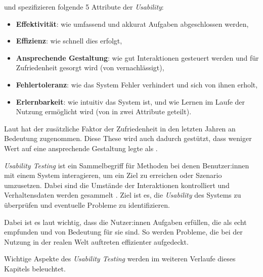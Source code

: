 \textcite{quesenberyDimensionsUsability2003} und \textcite{nielsenUsabilityEngineering1994} spezifizieren folgende 5 Attribute der \textit{Usability}:
\begin{itemize}
  \item \textbf{Effektivität}: wie umfassend und akkurat Aufgaben abgeschlossen werden,
  \item \textbf{Effizienz}: wie schnell dies erfolgt,
  \item \textbf{Ansprechende Gestaltung}: wie gut Interaktionen gesteuert werden und für Zufriedenheit gesorgt wird (von \citeauthor{nielsenUsabilityEngineering1994} vernachlässigt),
  \item \textbf{Fehlertoleranz}: wie das System Fehler verhindert und sich von ihnen erholt,
  \item \textbf{Erlernbarkeit}: wie intuitiv das System ist, und wie Lernen im Laufe der Nutzung ermöglicht wird (von \citeauthor{nielsenUsabilityEngineering1994} in zwei Attribute geteilt).
\end{itemize}
Laut \textcite{barnumUsabilityTesting2021} hat der zusätzliche Faktor der Zufriedenheit in den letzten Jahren an Bedeutung zugenommen. Diese These wird auch dadurch gestützt, dass \textcite{nielsenUsabilityEngineering1994} weniger Wert auf eine ansprechende Gestaltung legte als \textcite{quesenberyDimensionsUsability2003}.

\newpage

\textit{Usability Testing} ist ein Sammelbegriff für Methoden bei denen Benutzer:innen mit einem System interagieren, um ein Ziel zu erreichen oder Szenario umzusetzen. Dabei sind die Umstände der Interaktionen kontrolliert und Verhaltensdaten werden gesammelt \parencite{wichanskyUsabilityTesting2000}. Ziel ist es, die \textit{Usability} des Systems zu überprüfen und eventuelle Probleme zu identifizieren.

Dabei ist es laut \textcite{barnumUsabilityTesting2021} wichtig, dass die Nutzer:innen Aufgaben erfüllen, die als echt empfunden und von Bedeutung für sie sind. So werden Probleme, die bei der Nutzung in der realen Welt auftreten effizienter aufgedeckt.

Wichtige Aspekte des \textit{Usability Testing} werden im weiteren Verlaufe dieses Kapitels beleuchtet.
